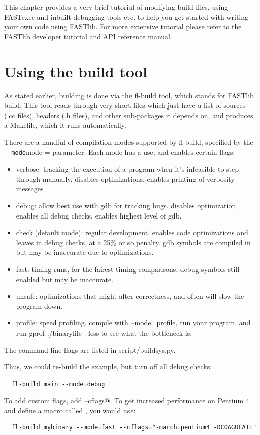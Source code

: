 \documentclass[letter]{report}
\begin{document}
This chapter provides a very brief tutorial of modifying build files, using FASTexec and inbuilt debugging tools etc. to help you get started with writing your own code using FASTlib. For more extensive tutorial please refer to the FASTlib developer tutorial and API reference manual.

\section {Using the build tool}

As stated earlier, building is done via the fl-build tool, which stands for FASTlib build. This tool reads through very short files which just have a list of sources (.cc files), headers (.h files), and other sub-packages it depends on, and produces a Makefile, which it runs automatically.

There are a handful of compilation modes supported by fl-build, specified by the \verb = --mode=mode = parameter. Each mode has a use, and enables certain flags:
\begin{itemize}
\item verbose: tracking the execution of a program when it's infeasible to step through manually. disables optimizations, enables printing of verbosity messages
\item debug: allow best use with gdb for tracking bugs. disables optimization, enables all debug checks, enables highest level of gdb.
\item check (default mode): regular development. enables code optimizations and leaves in debug checks, at a 25\% or so penalty. gdb symbols are compiled in but may be inaccurate due to optimizations.
\item fast: timing runs, for the fairest timing comparisons. debug symbols still enabled but may be inaccurate.
\item unsafe: optimizations that might alter correctness, and often will slow the program down.
\item profile: speed profiling. compile with --mode=profile, run your program, and run gprof ./binaryfile | less to see what the bottleneck is. 
\end{itemize}
The command line flags are listed in script/buildsys.py. 

Thus, we could re-build the example, but turn off all debug checks:
\begin{verbatim}
  fl-build main --mode=debug
\end{verbatim}
To add custom flags, add \verb@--cflags@. To get increased performance on Pentium 4 and define a macro called \verb@COAGULATE@, you would use:
\begin{verbatim}
  fl-build mybinary --mode=fast --cflags="-march=pentium4 -DCOAGULATE"
\end{verbatim}
\end{document}

